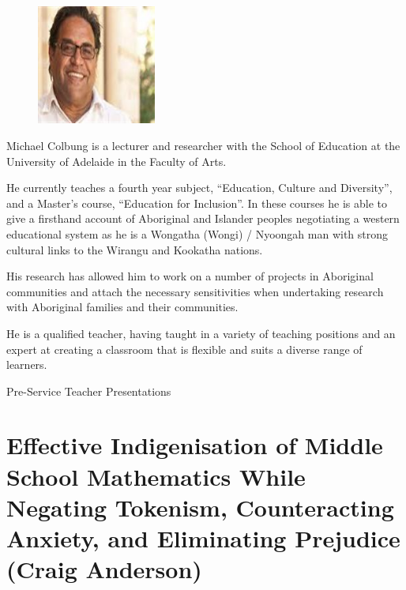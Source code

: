 \documentclass[twoside,14pt,a4paper,notitlepage]{memoir}
\begin{document}
\begin{figure}
\centering
\includegraphics[width=0.35\textwidth]{michael_colbung.jpeg}
\end{figure}

Michael Colbung is a lecturer and researcher with the School of Education at the University of Adelaide in the Faculty of Arts. 

He currently teaches a fourth year subject, “Education, Culture and Diversity”, and a Master’s course, “Education for Inclusion”. In these courses he is able to give a firsthand account of Aboriginal and Islander peoples negotiating a western educational system as he is a Wongatha (Wongi) / Nyoongah man with strong cultural links to the Wirangu and Kookatha nations.

His research has allowed him to work on a number of projects in Aboriginal communities and attach the necessary sensitivities when undertaking research with Aboriginal families and their communities.

He is a qualified teacher, having taught in a variety of teaching positions and an expert at creating a classroom that is flexible and suits a diverse range of learners.
\vfill



\clearpage{}
\vspace*{2cm}
{\Huge Pre-Service Teacher Presentations}
\vspace{2cm}


\section*{Effective Indigenisation of Middle School Mathematics While Negating Tokenism, Counteracting Anxiety, and Eliminating Prejudice (Craig Anderson)}
\label{aut:anderson}
\end{document}
